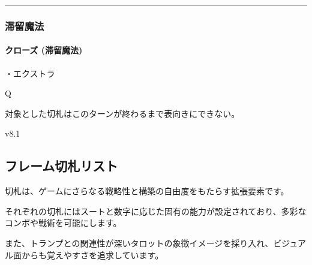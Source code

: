 \documentclass[letterpaper,10pt,dvipdfmx]{sphinxmanual}
\begin{document}
\bigskip\hrule\bigskip



\subsubsection{滞留魔法}
\label{\detokenize{auto/frameActionlist:id101}}

\paragraph{クローズ (滞留魔法)}
\label{\detokenize{auto/frameActionlist:fog-closefog}}\label{\detokenize{auto/frameActionlist:id102}}
\sphinxAtStartPar
{}

\sphinxAtStartPar
・エクストラ

\sphinxAtStartPar
{} Q

\sphinxAtStartPar
{}

\sphinxAtStartPar
対象とした切札はこのターンが終わるまで表向きにできない。

\sphinxAtStartPar
{}  v8.1


\subsection{フレーム切札リスト}
\label{\detokenize{auto/frameActionlist:trumplist-act-frame}}\label{\detokenize{auto/frameActionlist:id103}}
\sphinxAtStartPar
切札は、ゲームにさらなる戦略性と構築の自由度をもたらす拡張要素です。

\sphinxAtStartPar
それぞれの切札にはスートと数字に応じた固有の能力が設定されており、多彩なコンボや戦術を可能にします。

\sphinxAtStartPar
また、トランプとの関連性が深いタロットの象徴イメージを採り入れ、ビジュアル面からも覚えやすさを追求しています。
\end{document}
